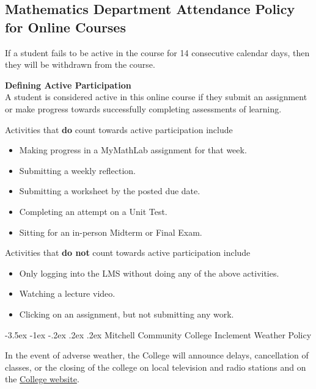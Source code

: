 \documentclass{article}
\makeatletter
\renewcommand\section{\@startsection{section}{1}{0pt}%
  {-3.5ex \@plus -1ex \@minus -.2ex}%
  {.2ex \@plus.2ex}%
  {\normalfont\Large\bfseries}} %
\renewenvironment{framed}[1][]{%
  \def\FrameCommand{%
    \hspace{1pt}%
    {\color{mybordercolor}\vrule width 2pt} %
    \hspace{1pt}%
    \fboxsep=\FrameSep%
    \colorbox{mybgcolor}%
  }%
  \MakeFramed {\advance\hsize-\width \FrameRestore}%
}{%
  \endMakeFramed
}
\makeatother
\begin{document}
\subsection{Mathematics Department Attendance Policy for Online Courses}

If a student fails to be active in the course for 14 consecutive calendar days, then they will be withdrawn from the course.

\begin{framed}
\textbf{Defining Active Participation}\\
A student is considered active in this online course if they submit an assignment or make progress towards successfully completing assessments of learning.

Activities that \textbf{do} count towards active participation include

\begin{itemize}
\item Making progress in a MyMathLab assignment for that week.
\item Submitting a weekly reflection.
\item Submitting a worksheet by the posted due date.
\item Completing an attempt on a Unit Test.
\item Sitting for an in-person Midterm or Final Exam.
\end{itemize}

Activities that \textbf{do not} count towards active participation include

\begin{itemize}
\item Only logging into the LMS without doing any of the above activities.
\item Watching a lecture video.
\item Clicking on an assignment, but not submitting any work.
\end{itemize}
\end{framed}

\section{Mitchell Community College Inclement Weather Policy}

In the event of adverse weather, the College will announce delays, cancellation of classes, or the closing of the college on local television and radio stations and on the \href{https://www.mitchellcc.edu}{College website}.
\end{document}
